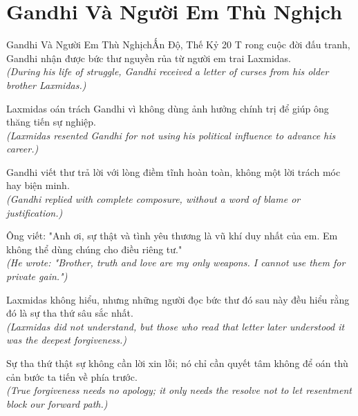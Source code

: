 \section{Gandhi Và Người Em Thù Nghịch}
\begin{truyen}{Gandhi Và Người Em Thù Nghịch}{Ấn Độ, Thế Kỷ 20}
T rong cuộc đời đấu tranh, Gandhi nhận được bức thư nguyền rủa từ người em trai Laxmidas.\\
\textit{(During his life of struggle, Gandhi received a letter of curses from his older brother Laxmidas.)}

Laxmidas oán trách Gandhi vì không dùng ảnh hưởng chính trị để giúp ông thăng tiến sự nghiệp.\\
\textit{(Laxmidas resented Gandhi for not using his political influence to advance his career.)}

Gandhi viết thư trả lời với lòng điềm tĩnh hoàn toàn, không một lời trách móc hay biện minh.\\
\textit{(Gandhi replied with complete composure, without a word of blame or justification.)}

Ông viết: "Anh ơi, sự thật và tình yêu thương là vũ khí duy nhất của em. Em không thể dùng chúng cho điều riêng tư."\\
\textit{(He wrote: "Brother, truth and love are my only weapons. I cannot use them for private gain.")}

Laxmidas không hiểu, nhưng những người đọc bức thư đó sau này đều hiểu rằng đó là sự tha thứ sâu sắc nhất.\\
\textit{(Laxmidas did not understand, but those who read that letter later understood it was the deepest forgiveness.)}

\end{truyen}
\begin{baihoc}
  Sự tha thứ thật sự không cần lời xin lỗi; nó chỉ cần quyết tâm không để oán thù cản bước ta tiến về phía trước.\\
  \textit{(True forgiveness needs no apology; it only needs the resolve not to let resentment block our forward path.)}
\end{baihoc}

